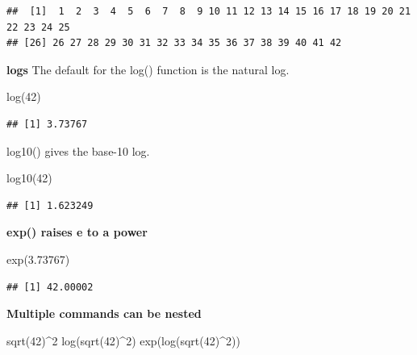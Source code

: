 \documentclass[
]{book}
\newenvironment{Shaded}{\begin{snugshade}}{\end{snugshade}}
\newcommand{\DecValTok}[1]{\textcolor[rgb]{0.00,0.00,0.81}{#1}}
\newcommand{\FloatTok}[1]{\textcolor[rgb]{0.00,0.00,0.81}{#1}}
\newcommand{\FunctionTok}[1]{\textcolor[rgb]{0.00,0.00,0.00}{#1}}
\newcommand{\NormalTok}[1]{#1}
\newcommand{\SpecialCharTok}[1]{\textcolor[rgb]{0.00,0.00,0.00}{#1}}
\begin{document}
\begin{verbatim}
##  [1]  1  2  3  4  5  6  7  8  9 10 11 12 13 14 15 16 17 18 19 20 21 22 23 24 25
## [26] 26 27 28 29 30 31 32 33 34 35 36 37 38 39 40 41 42
\end{verbatim}

\textbf{logs}
The default for the log() function is the natural log.

\begin{Shaded}
\begin{Highlighting}[]
\FunctionTok{log}\NormalTok{(}\DecValTok{42}\NormalTok{)}
\end{Highlighting}
\end{Shaded}

\begin{verbatim}
## [1] 3.73767
\end{verbatim}

log10() gives the base-10 log.

\begin{Shaded}
\begin{Highlighting}[]
\FunctionTok{log10}\NormalTok{(}\DecValTok{42}\NormalTok{)}
\end{Highlighting}
\end{Shaded}

\begin{verbatim}
## [1] 1.623249
\end{verbatim}

\textbf{exp() raises e to a power}

\begin{Shaded}
\begin{Highlighting}[]
\FunctionTok{exp}\NormalTok{(}\FloatTok{3.73767}\NormalTok{)}
\end{Highlighting}
\end{Shaded}

\begin{verbatim}
## [1] 42.00002
\end{verbatim}

\textbf{Multiple commands can be nested}

\begin{Shaded}
\begin{Highlighting}[]
\FunctionTok{sqrt}\NormalTok{(}\DecValTok{42}\NormalTok{)}\SpecialCharTok{\^{}}\DecValTok{2}
\FunctionTok{log}\NormalTok{(}\FunctionTok{sqrt}\NormalTok{(}\DecValTok{42}\NormalTok{)}\SpecialCharTok{\^{}}\DecValTok{2}\NormalTok{)}
\FunctionTok{exp}\NormalTok{(}\FunctionTok{log}\NormalTok{(}\FunctionTok{sqrt}\NormalTok{(}\DecValTok{42}\NormalTok{)}\SpecialCharTok{\^{}}\DecValTok{2}\NormalTok{))}
\end{Highlighting}
\end{Shaded}


  
\end{document}
